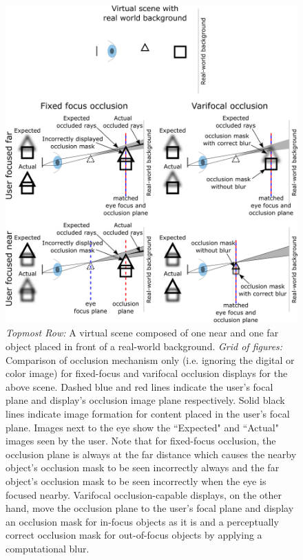 \begin{figure}[t]
\centering
\includegraphics[width=0.9\columnwidth]{images/varifocal_occlusion/depth-dependent-occlusion}
\caption[Varifocal-Occlusion NED: concept of depth-dependent occlusion]{\emph{Topmost Row:} A virtual scene composed of one near and one far object placed in front of a real-world background. \emph{Grid of figures:} Comparison of occlusion mechanism only (i.e. ignoring the digital or color image) for fixed-focus and varifocal occlusion displays for the above scene. Dashed blue and red lines indicate the user's focal plane and display's occlusion image plane respectively. Solid black lines indicate image formation for content placed in the user's focal plane. Images next to the eye show the ``Expected" and ``Actual" images seen by the user. Note that for fixed-focus occlusion, the occlusion plane is always at the far distance which causes the nearby object's occlusion mask to be seen incorrectly always and the far object's occlusion mask to be seen incorrectly when the eye is focused nearby. Varifocal occlusion-capable displays, on the other hand, move the occlusion plane to the user's focal plane and display an occlusion mask for in-focus objects as it is and a perceptually correct occlusion mask for out-of-focus objects by applying a computational blur.}
\label{fig:varifocal_occlusion:depth-dependent-occlusion}
\end{figure}
